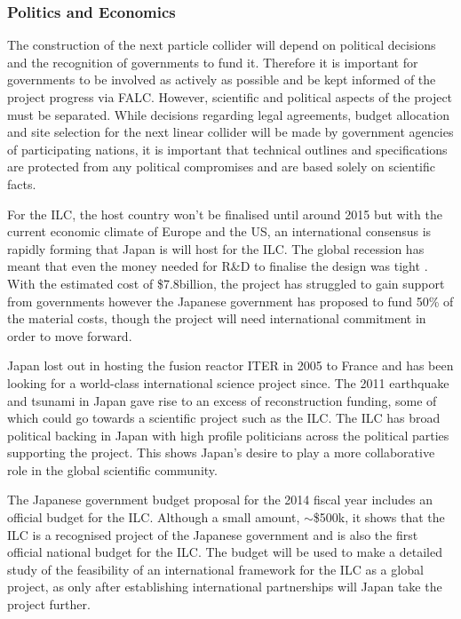  
\subsubsection{Politics and Economics}

The construction of the next particle collider will depend on political decisions and the recognition of governments to fund it. Therefore it is important for governments to be involved as actively as possible and be kept informed of the project progress via FALC. However, scientific and political aspects of the project must be separated. While decisions regarding legal agreements, budget allocation and site selection for the next linear collider will be made by government agencies of participating nations, it is important that technical outlines and specifications are protected from any political compromises and are based solely on scientific facts. \cite{ILC:PIPReport}

For the ILC, the host country won't be finalised until around 2015 but with the current economic climate of Europe and the US, an international consensus is rapidly forming that Japan is will host for the ILC. The global recession has meant that even the money needed for R\&D to finalise the design was tight \cite{Funding:Nature}.  With the estimated cost of \$7.8billion, the project has struggled to gain support from governments however the Japanese government has proposed to fund 50\% of the material costs, though the project will need international commitment in order to move forward.

Japan lost out in hosting the fusion reactor ITER in 2005 to France and has been looking for a world-class international science project since. The 2011 earthquake and tsunami in Japan gave rise to an excess of reconstruction funding, some of which could go towards a scientific project such as the ILC. The ILC has broad political backing in Japan with high profile politicians across the political parties supporting the project. This shows Japan's desire to play a more collaborative role in the global scientific community. \cite{Funding:NaturePress1}

The Japanese government budget proposal for the 2014 fiscal year includes an official budget for the ILC. Although a small amount,   $\sim$\$500k, it shows that the ILC is a recognised project of the Japanese government and is also the first official national budget for the ILC. The budget will be used to make a detailed study of the feasibility of an international framework for the ILC as a global project, as only after establishing international partnerships will Japan take the project further. \cite{LCC:Press4}
 
